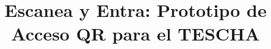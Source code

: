 \documentclass[stu,11pt,floatsintext,biblatex]{apa7}
\title{Escanea y Entra: Prototipo de Acceso QR para el TESCHA}
\begin{document}
\maketitle
\justifying













\printbibliography
\end{document}
